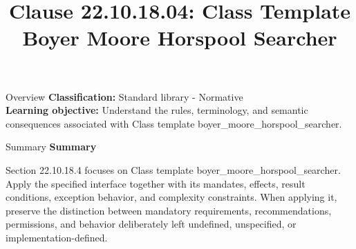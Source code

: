 \documentclass[10pt,letterpaper]{article}
\title{Clause 22.10.18.04: Class Template Boyer Moore Horspool Searcher}
\author{}
\date{}
\begin{document}
\maketitle
\begin{CornellOverviewBox}{Overview}
\textbf{Classification:} Standard library - Normative\\[2pt]
\textbf{Learning objective:} Understand the rules, terminology, and semantic consequences associated with Class template boyer\_moore\_horspool\_searcher.
\end{CornellOverviewBox}\begin{CornellSummaryBox}{Summary}
{\sffamily\bfseries\color{Accent} Summary}\par\vspace{3pt}Section 22.10.18.4 focuses on Class template boyer\_moore\_horspool\_searcher. Apply the specified interface together with its mandates, effects, result conditions, exception behavior, and complexity constraints. When applying it, preserve the distinction between mandatory requirements, recommendations, permissions, and behavior deliberately left undefined, unspecified, or implementation-defined.
\end{CornellSummaryBox}
\end{document}
